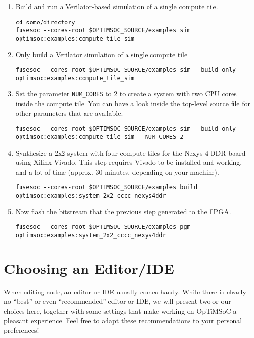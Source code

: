 \begin{enumerate}
\item Build and run a Verilator-based simulation of a single compute tile.
\begin{lstlisting}
cd some/directory
fusesoc --cores-root $OPTIMSOC_SOURCE/examples sim optimsoc:examples:compute_tile_sim
\end{lstlisting}

\item Only build a Verilator simulation of a single compute tile
\begin{lstlisting}
fusesoc --cores-root $OPTIMSOC_SOURCE/examples sim --build-only optimsoc:examples:compute_tile_sim
\end{lstlisting}

\item Set the parameter \verb|NUM_CORES| to 2 to create a system with two CPU cores inside the compute tile.
  You can have a look inside the top-level source file  for other parameters that are available.
\begin{lstlisting}
fusesoc --cores-root $OPTIMSOC_SOURCE/examples sim --build-only optimsoc:examples:compute_tile_sim --NUM_CORES 2
\end{lstlisting}

\item Synthesize a 2x2 system with four compute tiles for the Nexys 4 DDR board using Xilinx Vivado.
This step requires Vivado to be installed and working, and a lot of time (approx. 30 minutes, depending on your machine).
\begin{lstlisting}
fusesoc --cores-root $OPTIMSOC_SOURCE/examples build optimsoc:examples:system_2x2_cccc_nexys4ddr
\end{lstlisting}

\item Now flash the bitstream that the previous step generated to the FPGA.
\begin{lstlisting}
fusesoc --cores-root $OPTIMSOC_SOURCE/examples pgm optimsoc:examples:system_2x2_cccc_nexys4ddr
\end{lstlisting}
\end{enumerate}


\section{Choosing an Editor/IDE}

When editing code, an editor or IDE usually comes handy. While there is clearly
no ``best'' or even ``recommended'' editor or IDE, we will present two or our
choices here, together with some settings that make working on OpTiMSoC a
pleasant experience. Feel free to adapt these recommendations to your personal
preferences!

